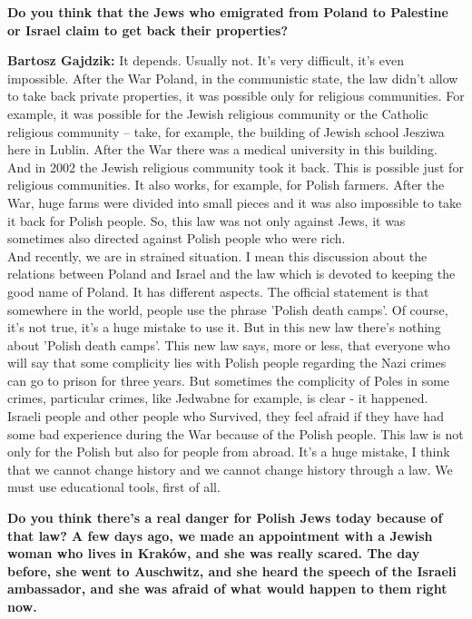 \textbf{Do you think that the Jews who emigrated from Poland to Palestine or Israel claim to get back their properties?} 

\textbf{Bartosz Gajdzik:} It depends. Usually not. It’s very difficult, it’s even impossible. After the War Poland, in the communistic state, the law didn’t allow to take back private properties, it was possible only for religious communities. For example, it was possible for the Jewish religious community or the Catholic religious community – take, for example, the building of Jewish school Jesziwa here in Lublin. After the War there was a medical university in this building. And in 2002 the Jewish religious community took it back. This is possible just for religious communities. It also works, for example, for Polish farmers. After the War, huge farms were divided into small pieces and it was also impossible to take it back for Polish people. So, this law was not only against Jews, it was sometimes also directed against Polish people who were rich.\\ 
And recently, we are in strained situation. I mean this discussion about the relations between Poland and Israel and the law which is devoted to keeping the good name of Poland. It has different aspects. The official statement is that somewhere in the world, people use the phrase 'Polish death camps'. Of course, it’s not true, it’s a huge mistake to use it. But in this new law there’s nothing about 'Polish death camps'. This new law says, more or less, that everyone who will say that some complicity lies with Polish people regarding the Nazi crimes can go to prison for three years. But sometimes the complicity of Poles in some crimes, particular crimes, like Jedwabne for example, is clear - it happened. Israeli people and other people who Survived, they feel afraid if they have had some bad experience during the War because of the Polish people. This law is not only for the Polish but also for people from abroad. It’s a huge mistake, I think that we cannot change history and we cannot change history through a law. We must use educational tools, first of all. 

\textbf{Do you think there’s a real danger for Polish Jews today because of that law? A few days ago, we made an appointment with a Jewish woman who lives in Kraków, and she was really scared. The day before, she went to Auschwitz, and she heard the speech of the Israeli ambassador, and she was afraid of what would happen to them right now.}  

